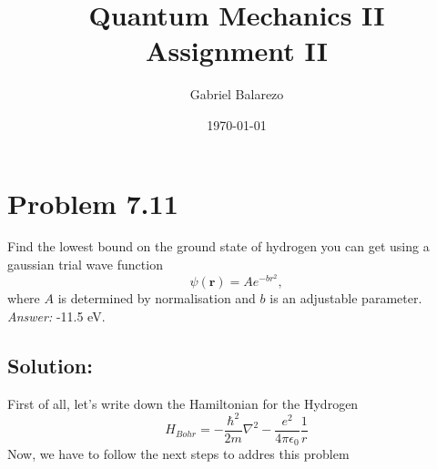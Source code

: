 \documentclass[12 pt]{article}
\title{Quantum Mechanics II\\
Assignment II}
\author{Gabriel Balarezo}
\date{\today}
\numberwithin{equation}{section}
\begin{document}
\maketitle

\section{Problem 7.11}
Find the lowest bound on the ground state of hydrogen you can get using a gaussian trial wave
function 
\begin{equation}
  \psi(\mathbf{r}) = A e^{-br^2},
\end{equation}
where $A$ is determined by normalisation and $b$ is an adjustable parameter. \emph{Answer:}
-11.5 eV.
\subsection*{Solution:}
First of all, let's write down the Hamiltonian for the Hydrogen
\begin{equation}
  H_{Bohr} = -\frac{\hbar^2}{2m}\nabla^2 - \frac{e^2}{4\pi \epsilon_0}\frac{1}{r}
\end{equation}
Now, we have to follow the next steps to addres this problem 
\end{document}
